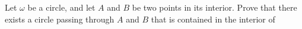 Let $\omega$ be a circle, and let $A$ and $B$ be two points in its interior.  Prove that there exists a circle passing through $A$ and $B$ that is contained in the interior of 